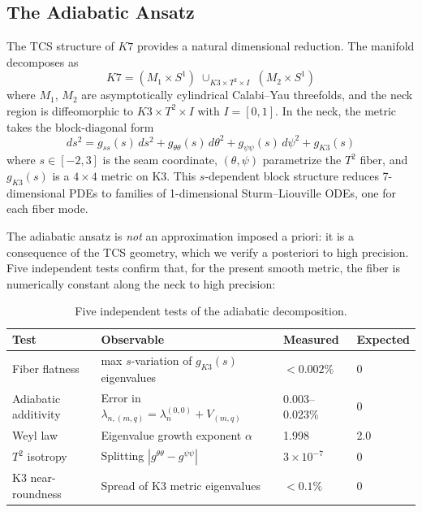 \documentclass[11pt,a4paper]{article}
\newcommand{\Kseven}{K_7}
\theoremstyle{remark}
\def\Kseven{K7}%
\begin{document}
\subsection{The Adiabatic Ansatz}

The TCS structure of $\Kseven$ provides a natural dimensional reduction. The manifold
decomposes as
\begin{equation}
\Kseven = (M_1 \times S^1) \;\cup_{K3 \times T^2 \times I}\; (M_2 \times S^1)
\end{equation}
where $M_1$, $M_2$ are asymptotically cylindrical Calabi--Yau threefolds, and the neck
region is diffeomorphic to $K3 \times T^2 \times I$ with $I = [0, 1]$. In the neck, the metric
takes the block-diagonal form
\begin{equation}
ds^2 = g_{ss}(s)\, ds^2 + g_{\theta\theta}(s)\, d\theta^2 + g_{\psi\psi}(s)\, d\psi^2 + g_{K3}(s)
\end{equation}
where $s \in [-2, 3]$ is the seam coordinate, $(\theta, \psi)$ parametrize the $T^2$ fiber, and
$g_{K3}(s)$ is a $4 \times 4$ metric on K3. This $s$-dependent block structure reduces
7-dimensional PDEs to families of 1-dimensional Sturm--Liouville ODEs, one for each
fiber mode.

The adiabatic ansatz is \textit{not} an approximation imposed a priori: it is a consequence
of the TCS geometry, which we verify a posteriori to high precision. Five independent
tests confirm that, for the present smooth metric, the fiber is numerically
constant along the neck to high precision:

\begin{table}[htbp]
\centering
\begin{tabular}{llll}
\toprule
Test & Observable & Measured & Expected \\
\midrule
Fiber flatness & max $s$-variation of $g_{K3}(s)$ eigenvalues & $< 0.002\%$ & 0 \\
Adiabatic additivity & Error in $\lambda_{n,(m,q)} = \lambda_n^{(0,0)} + V_{(m,q)}$ & 0.003--0.023\% & 0 \\
Weyl law & Eigenvalue growth exponent $\alpha$ & 1.998 & 2.0 \\
$T^2$ isotropy & Splitting $|g^{\theta\theta} - g^{\psi\psi}|$ & $3 \times 10^{-7}$ & 0 \\
K3 near-roundness & Spread of K3 metric eigenvalues & $< 0.1\%$ & 0 \\
\bottomrule
\end{tabular}
\caption{Five independent tests of the adiabatic decomposition.}
\label{tab:adiabatic_tests}
\end{table}
\end{document}

